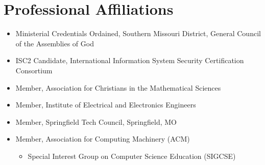 \documentclass[11pt,letterpaper]{article}
\begin{document}
\section{Professional Affiliations}\vspace{5pt}
\begin{itemize}[label=\textcolor{EUMaroon}{\textbullet}, noitemsep]
   
    \item Ministerial Credentials Ordained, Southern Missouri District, General Council of the Assemblies of God
     \item ISC2 Candidate, International Information System Security Certification Consortium
     \item Member, Association for Christians in the Mathematical Sciences
    \item Member, Institute of Electrical and Electronics Engineers
    \item Member, Springfield Tech Council, Springfield, MO
    \item Member, Association for Computing Machinery (ACM) 
\begin{itemize} [noitemsep, topsep=0pt]
    \item Special Interest Group on Computer Science Education (SIGCSE)

\end{itemize}
\newpage

\end{itemize}
\end{document}
